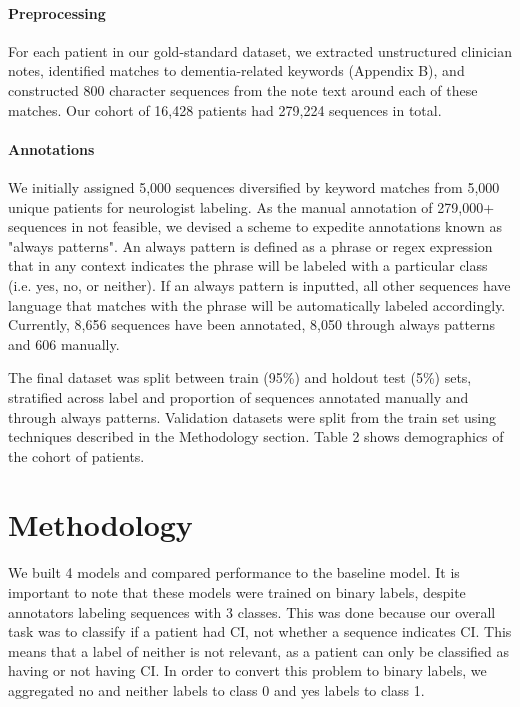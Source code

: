 \documentclass[pmlr,twocolumn,10pt]{jmlr} %
\begin{document}
\paragraph{Preprocessing}
\label{sec:Preprocessing} For each patient in our gold-standard dataset, we extracted unstructured clinician notes, identified matches to dementia-related keywords (Appendix B), and constructed 800 character sequences from the note text around each of these matches. Our cohort of 16,428 patients had 279,224 sequences in total. 

\paragraph{Annotations}
\label{sec:Annotations} We initially assigned 5,000 sequences diversified by keyword matches from 5,000 unique patients for neurologist labeling. As the manual annotation of 279,000+ sequences in not feasible, we devised a scheme to expedite annotations known as "always patterns". An always pattern is defined as a phrase or regex expression that in any context indicates the phrase will be labeled with a particular class (i.e. yes, no, or neither). If an always pattern is inputted, all other sequences have language that matches with the phrase will be automatically labeled accordingly. %
Currently, 8,656 sequences have been annotated, 8,050 through always patterns and 606 manually. %

The final dataset was split between train (95\%) and holdout test (5\%) sets, stratified across label and proportion of sequences annotated manually and through always patterns. %
Validation datasets were split from the train set using techniques described in the Methodology section. Table 2 shows demographics of the cohort of patients.  

\section{Methodology}
\label{sec:Methodology}  

We built 4 models and compared performance to the baseline model. It is important to note that these models were trained on binary labels, despite annotators labeling sequences with 3 classes. This was done because our overall task was to classify if a patient had CI, not whether a sequence indicates CI. This means that a label of neither is not relevant, as a patient can only be classified as having or not having CI. In order to convert this problem to binary labels, we aggregated no and neither labels to class 0 and yes labels to class 1. 
\end{document}
